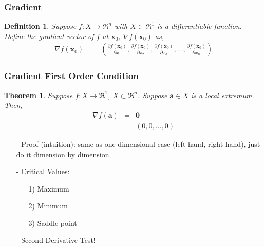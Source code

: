 \documentclass{beamer}
\newtheorem{thm}{Theorem}
\newtheorem{defn}{Definition}
\numberwithin{equation}{section}
\begin{document}
\begin{frame}
\frametitle{Gradient} 

\begin{defn} 
Suppose $f:X \rightarrow \Re^{n}$ with $X \subset \Re^{1}$ is a differentiable function.  Define the gradient vector of $f$ at $\boldsymbol{x}_{0}$, $\nabla f(\boldsymbol{x}_{0})$ as, 
\begin{eqnarray}
\nabla f (\boldsymbol{x}_{0})  & = & \left(\frac{\partial f (\boldsymbol{x}_{0}) }{\partial x_{1} }, \frac{\partial f (\boldsymbol{x}_{0}) }{\partial x_{2} }, \frac{\partial f (\boldsymbol{x}_{0}) }{\partial x_{3} }, \hdots, \frac{\partial f (\boldsymbol{x}_{0}) }{\partial x_{n} } \right) \nonumber 
\end{eqnarray}

\end{defn}



\end{frame}



\begin{frame}
\frametitle{Gradient First Order Condition}

\begin{thm}
Suppose $f:X \rightarrow \Re^{1}$, $X \subset \Re^{n}$.  Suppose $\boldsymbol{a} \in X$ is a \alert{local} extremum.  Then, 
\begin{eqnarray}
\nabla f(\boldsymbol{a}) & = & \boldsymbol{0} \nonumber \\
									& = & (0, 0, \hdots, 0) \nonumber 				
\end{eqnarray}


\end{thm}

\begin{itemize}
\item[-] Proof (intuition): same as one dimensional case (left-hand, right hand), just do it dimension by dimension
\item[-] \alert{Critical Values}: 
\begin{itemize}
\item[1)] Maximum
\item[2)] Minimum 
\item[3)] \alert{Saddle point} 
\end{itemize}
\item[-] \alert{Second Derivative Test}!
\end{itemize}

\end{frame}
\end{document}
